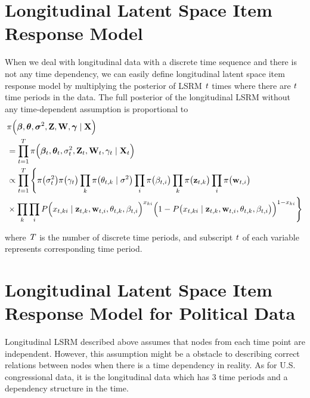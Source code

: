 \documentclass[a4paper, 11pt]{report}
\begin{document}
\begin{itemize}
\section{Longitudinal Latent Space Item Response Model}\label{llsrm}
When we deal with longitudinal data with a discrete time sequence and there is not any time dependency, we can easily define longitudinal latent space item response model by multiplying the posterior of LSRM $\it{t}$ times where there are $\it{t}$ time periods in the data. The full posterior of the longitudinal LSRM without any time-dependent assumption is proportional to 
\begin{equation}
\label{longitudinal}
\begin{split}
&\pi\Big(\boldsymbol\beta, \boldsymbol\theta, \boldsymbol\sigma^2, {\bf Z}, {\bf W}, \boldsymbol\gamma \mid {\bf X}\Big)\\
&= \prod_{t=1}^T \pi\Big(\boldsymbol\beta_t, \boldsymbol\theta_t, \sigma_t^2, {\bf Z}_t, {\bf W}_t, \gamma_t \mid {\bf X}_t\Big)\\ 
&\propto \prod_{t=1}^T \Bigg\{\pi\big(\sigma_t^2\big) \pi\big(\gamma_t\big) \prod_{k}\pi\big(\theta_{t,k} \mid \sigma^2\big) \prod_{i}\pi\big(\beta_{t,i}\big)
\prod_{k}\pi\big({\bf z}_{t,k}\big) \prod_{i}\pi\big({\bf w}_{t,i}\big)\\
&\times \prod_k \prod_i P\Big(x_{t,ki} \mid {\bf z}_{t,k}, {\bf w}_{t,i}, \theta_{t,k}, \beta_{t,i}\Big)^{x_{ki}}\Big(1-P\big(x_{t,ki} \mid {\bf z}_{t,k}, {\bf w}_{t,i}, \theta_{t,k}, \beta_{t,i}\big)\Big)^{1-x_{ki}}\Bigg\}
\end{split}
\end{equation}

where $\it{T}$ is the number of discrete time periods, and subscript $\it{t}$ of each variable represents corresponding time period.

\section{Longitudinal Latent Space Item Response Model for Political Data}

\quad Longitudinal LSRM described above assumes that nodes from each time point are independent. However, this assumption might be a obstacle to describing correct relations between nodes when there is a time dependency in reality. As for U.S. congressional data, it is the longitudinal data which has 3 time periods and a dependency structure in the time.


\end{itemize}
\end{document}
